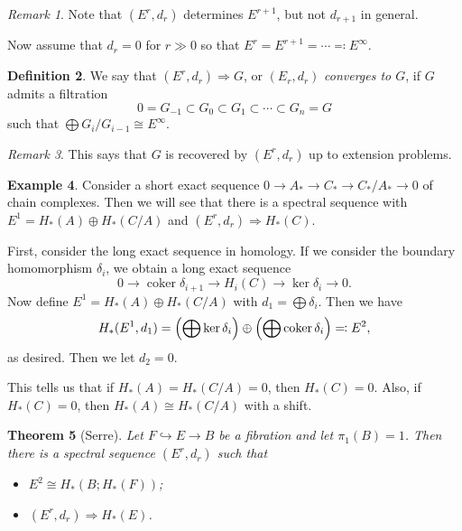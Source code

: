 \documentclass[leqno, openany]{memoir}
\newtheorem{thm}{Theorem}[section]
\theoremstyle{definition}
\newtheorem{defn}[thm]{Definition}
\newtheorem{exm}[thm]{Example}
\theoremstyle{remark}
\newtheorem{rmk}[thm]{Remark}
\theoremstyle{plain}
\theoremstyle{definition}
\theoremstyle{remark}
\begin{document}
\begin{rmk}
    Note that $(E^r, d_r)$ determines $E^{r+1}$, but not $d_{r+1}$ in general.
\end{rmk}

Now assume that $d_r = 0$ for $r \gg 0$ so that $E^r = E^{r+1} = \cdots \eqqcolon E^{\infty}$.

\begin{defn}
    We say that $(E^r, d_r) \Rightarrow G$, or $(E_r, d_r)$ \textit{converges to $G$}, if $G$ admits a filtration
    \[ 0 = G_{-1} \subset G_0 \subset G_1 \subset \cdots \subset G_n = G \] such that $\bigoplus G_i / G_{i-1} \cong E^{\infty}$.
\end{defn}

\begin{rmk}
    This says that $G$ is recovered by $(E^r, d_r)$ up to extension problems.
\end{rmk}

\begin{exm}
    Consider a short exact sequence $0 \to A_* \to C_* \to C_*/A_* \to 0$ of chain complexes. Then we will see that there is a spectral sequence with $E^1 = H_*(A) \oplus H_*(C/A)$ and $(E^r, d_r) \Rightarrow H_*(C)$. 

    First, consider the long exact sequence in homology. If we consider the boundary homomorphism $\delta_i$, we obtain a long exact sequence
    \[ 0 \to \operatorname{coker} \delta_{i+1} \to H_i(C) \to \ker \delta_i \to 0. \]
    Now define $E^1 = H_*(A) \oplus H_*(C / A)$ with $d_1 = \bigoplus \delta_i$. Then we have 
    \[ H_*(E^1, d_1) = \qty( \bigoplus \ker \delta_i ) \oplus \qty(\bigoplus \operatorname{coker} \delta_i) \eqqcolon E^2, \]
    as desired. Then we let $d_2 = 0$.
\end{exm}

This tells us that if $H_*(A) = H_*(C/A) = 0$, then $H_*(C) = 0$. Also, if $H_*(C) = 0$, then $H_*(A) \cong H_*(C/A)$ with a shift.

\begin{thm}[Serre]
    Let $F \hookrightarrow E \to B$ be a fibration and let $\pi_1(B) = 1$. Then there is a spectral sequence $(E^r, d_r)$ such that
    \begin{itemize}
        \item $E^2 \cong H_*(B; H_*(F))$;
        \item $(E^r, d_r) \Rightarrow H_*(E)$.
    \end{itemize}
\end{thm}
\end{document}
